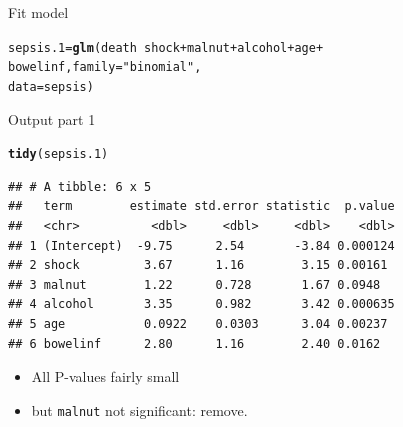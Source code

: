 \documentclass[unknownkeysallowed]{beamer}\usepackage[]{graphicx}\usepackage[]{color}
\makeatletter
\newcommand{\hlstr}[1]{\textcolor[rgb]{0.192,0.494,0.8}{#1}}%
\newcommand{\hlopt}[1]{\textcolor[rgb]{0,0,0}{#1}}%
\newcommand{\hlstd}[1]{\textcolor[rgb]{0.345,0.345,0.345}{#1}}%
\newcommand{\hlkwb}[1]{\textcolor[rgb]{0.69,0.353,0.396}{#1}}%
\newcommand{\hlkwc}[1]{\textcolor[rgb]{0.333,0.667,0.333}{#1}}%
\newcommand{\hlkwd}[1]{\textcolor[rgb]{0.737,0.353,0.396}{\textbf{#1}}}%
\newenvironment{kframe}{%
 \def\at@end@of@kframe{}%
 \ifinner\ifhmode%
  \def\at@end@of@kframe{\end{minipage}}%
  \begin{minipage}{\columnwidth}%
 \fi\fi%
 \def\FrameCommand##1{\hskip\@totalleftmargin \hskip-\fboxsep
 \colorbox{shadecolor}{##1}\hskip-\fboxsep
     \hskip-\linewidth \hskip-\@totalleftmargin \hskip\columnwidth}%
 \MakeFramed {\advance\hsize-\width
   \@totalleftmargin\z@ \linewidth\hsize
   \@setminipage}}%
 {\par\unskip\endMakeFramed%
 \at@end@of@kframe}
\newenvironment{knitrout}{}{} %
\makeatother
\begin{document}
\begin{frame}[fragile]{Fit model}
  
\begin{knitrout}
\color{fgcolor}\begin{kframe}
\begin{alltt}
\hlstd{sepsis.1}\hlkwb{=}\hlkwd{glm}\hlstd{(death}\hlopt{~}\hlstd{shock}\hlopt{+}\hlstd{malnut}\hlopt{+}\hlstd{alcohol}\hlopt{+}\hlstd{age}\hlopt{+}
              \hlstd{bowelinf,}\hlkwc{family}\hlstd{=}\hlstr{"binomial"}\hlstd{,}
              \hlkwc{data}\hlstd{=sepsis)}
\end{alltt}
\end{kframe}
\end{knitrout}
  
\end{frame}

\begin{frame}[fragile]{Output part 1}

 
\begin{knitrout}\footnotesize
{}\color{fgcolor}\begin{kframe}
\begin{alltt}
\hlkwd{tidy}\hlstd{(sepsis.1)}
\end{alltt}
\begin{verbatim}
## # A tibble: 6 x 5
##   term        estimate std.error statistic  p.value
##   <chr>          <dbl>     <dbl>     <dbl>    <dbl>
## 1 (Intercept)  -9.75      2.54       -3.84 0.000124
## 2 shock         3.67      1.16        3.15 0.00161 
## 3 malnut        1.22      0.728       1.67 0.0948  
## 4 alcohol       3.35      0.982       3.42 0.000635
## 5 age           0.0922    0.0303      3.04 0.00237 
## 6 bowelinf      2.80      1.16        2.40 0.0162
\end{verbatim}
\end{kframe}
\end{knitrout}

\begin{itemize}
\item All P-values fairly small
\item but \texttt{malnut} not significant: remove.
\end{itemize}


\end{frame}
\end{document}
